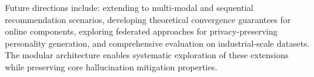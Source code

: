 \documentclass[acmsmall]{acmart}
\begin{document}
Future directions include: extending to multi-modal and sequential recommendation scenarios, developing theoretical convergence guarantees for online components, exploring federated approaches for privacy-preserving personality generation, and comprehensive evaluation on industrial-scale datasets. The modular architecture enables systematic exploration of these extensions while preserving core hallucination mitigation properties.
\newpage
\appendix
\end{document}
